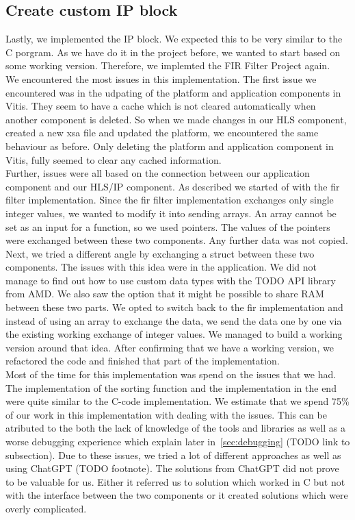\documentclass[conference]{IEEEtran}
\begin{document}
\subsection{Create custom IP block}
Lastly, we implemented the IP block. We expected this to be very similar to the C porgram. As we have do it in the project before, we wanted to start based on some working version. Therefore, we implemted the FIR Filter Project again. \\
We encountered the most issues in this implementation. The first issue we encountered was in the udpating of the platform and application components in Vitis. They seem to have a cache which is not cleared automatically when another component is deleted. So when we made changes in our HLS component, created a new xsa file and updated the platform, we encountered the same behaviour as before. Only deleting the platform and application component in Vitis, fully seemed to clear any cached information. \\
Further, issues were all based on the connection between our application component and our HLS/IP component. As described we started of with the fir filter implementation. Since the fir filter implementation exchanges only single integer values, we wanted to modify it into sending arrays. An array cannot be set as an input for a function, so we used pointers. The values of the pointers were exchanged between these two components. Any further data was not copied. Next, we tried a different angle by exchanging a struct between these two components. The issues with this idea were in the application. We did not manage to find out how to use custom data types with the TODO API library from AMD. We also saw the option that it might be possible to share RAM between these two parts. We opted to switch back to the fir implementation and instead of using an array to exchange the data, we send the data one by one via the existing working exchange of integer values. We managed to build a working version around that idea. After confirming that we have a working version, we refactored the code and finished that part of the implementation. \\
Most of the time for this implementation was spend on the issues that we had. The implementation of the sorting function and the implementation in the end were quite similar to the C-code implementation. We estimate that we spend 75\% of our work in this implementation with dealing with the issues. This can be atributed to the both the lack of knowledge of the tools and libraries as well as a worse debugging experience which explain later in~\ref{sec:debugging} (TODO link to subsection). Due to these issues, we tried a lot of different approaches as well as using ChatGPT (TODO footnote). The solutions from ChatGPT did not prove to be valuable for us. Either it referred us to solution which worked in C but not with the interface between the two components or it created solutions which were overly complicated.
\end{document}
